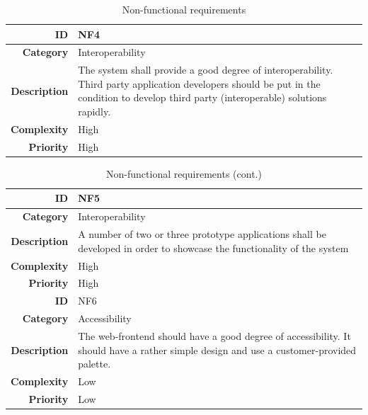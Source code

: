 \begin{table}[H]
\begin{center}
\begin{tabular}{ | r | p{11.5cm} | }
  \textbf{ID} & NF4 \\
  \hline\noalign{\smallskip}\hline
  \textbf{Category}			&	Interoperability \\
  \textbf{Description}	& The system shall provide a good degree of interoperability.
  												Third party application developers should be put in the condition to develop
  												third party (interoperable) solutions rapidly. \\
  \textbf{Complexity}		& High \\
  \textbf{Priority}			& High \\

  \hline
\end{tabular}
\end{center}
\caption{Non-functional requirements}
\label{table:nonfunc}
\end{table}

\begin{table}[H]
\begin{center}
\begin{tabular}{ | r | p{11.5cm} | }
	\hline

  \textbf{ID} & NF5 \\
  \hline\noalign{\smallskip}\hline
  \textbf{Category}     & Interoperability \\
  \textbf{Description}  & A number of two or three prototype applications shall be developed in order to showcase
                          the functionality of the system \\
  \textbf{Complexity}   & High \\
  \textbf{Priority}     & High \\
  \hline\noalign{\smallskip}\noalign{\smallskip}\hline
	
	\textbf{ID} & NF6 \\
  \hline\noalign{\smallskip}\hline
  \textbf{Category}			&	Accessibility \\
  \textbf{Description}	& The web-frontend should have a good degree of accessibility.
  												It should have a rather simple design and use a customer-provided palette. \\
  \textbf{Complexity}		& Low \\
  \textbf{Priority}			& Low \\
	
	\hline
\end{tabular}
\end{center}
\caption{Non-functional requirements (cont.)}
\end{table}

